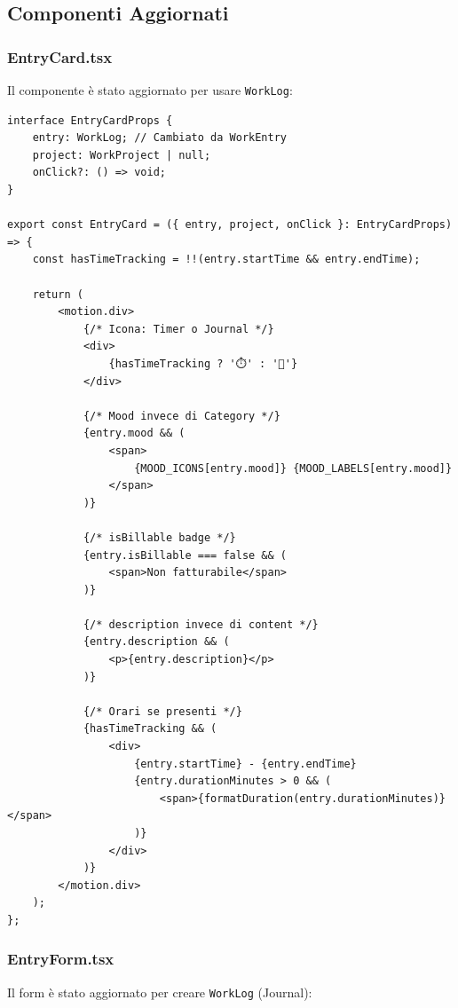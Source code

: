 \documentclass[11pt,a4paper]{article}
\begin{document}
\subsection{Componenti Aggiornati}

\subsubsection{EntryCard.tsx}

Il componente è stato aggiornato per usare \texttt{WorkLog}:

\begin{lstlisting}[caption=EntryCard Aggiornato]
interface EntryCardProps {
    entry: WorkLog; // Cambiato da WorkEntry
    project: WorkProject | null;
    onClick?: () => void;
}

export const EntryCard = ({ entry, project, onClick }: EntryCardProps) => {
    const hasTimeTracking = !!(entry.startTime && entry.endTime);
    
    return (
        <motion.div>
            {/* Icona: Timer o Journal */}
            <div>
                {hasTimeTracking ? '⏱️' : '📝'}
            </div>
            
            {/* Mood invece di Category */}
            {entry.mood && (
                <span>
                    {MOOD_ICONS[entry.mood]} {MOOD_LABELS[entry.mood]}
                </span>
            )}
            
            {/* isBillable badge */}
            {entry.isBillable === false && (
                <span>Non fatturabile</span>
            )}
            
            {/* description invece di content */}
            {entry.description && (
                <p>{entry.description}</p>
            )}
            
            {/* Orari se presenti */}
            {hasTimeTracking && (
                <div>
                    {entry.startTime} - {entry.endTime}
                    {entry.durationMinutes > 0 && (
                        <span>{formatDuration(entry.durationMinutes)}</span>
                    )}
                </div>
            )}
        </motion.div>
    );
};
\end{lstlisting}

\subsubsection{EntryForm.tsx}

Il form è stato aggiornato per creare \texttt{WorkLog} (Journal):
\end{document}
